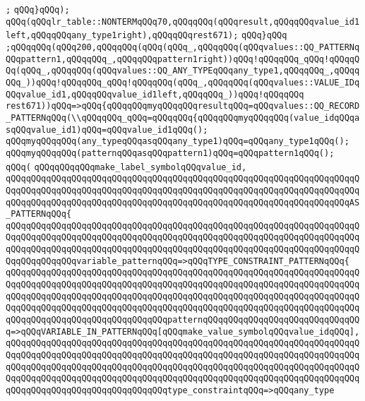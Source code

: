 \verb|;|\newline
\verb|qQQq}qQQq);|\newline
\verb|qQQq(qQQqlr_table::NONTERMqQQq70,qQQqqQQq(qQQqresult,qQQqqQQqvalue_id1left,qQQqqQQqany_type1right),qQQqqQQqrest671);|\newline
\verb|qQQq}qQQq|\newline
\verb|;qQQqqQQq(qQQq200,qQQqqQQq(qQQq(qQQq_,qQQqqQQq(qQQqvalues::QQ_PATTERNqQQqpattern1,qQQqqQQq_,qQQqqQQqpattern1right))qQQq!qQQqqQQq_qQQq!qQQqqQQq(qQQq_,qQQqqQQq(qQQqvalues::QQ_ANY_TYPEqQQqany_type1,qQQqqQQq_,qQQqqQQq_))qQQq!qQQqqQQq_qQQq!qQQqqQQq(qQQq_,qQQqqQQq(qQQqvalues::VALUE_IDqQQqvalue_id1,qQQqqQQqvalue_id1left,qQQqqQQq_))qQQq!qQQqqQQq|\newline
\verb|rest671))qQQq=>qQQq{qQQqqQQqmyqQQqqQQqresultqQQq=qQQqvalues::QQ_RECORD_PATTERNqQQq(\\qQQqqQQq_qQQq=qQQqqQQq{qQQqqQQqmyqQQqqQQq(value_idqQQqasqQQqvalue_id1)qQQq=qQQqvalue_id1qQQq();|\newline
\verb|qQQqmyqQQqqQQq(any_typeqQQqasqQQqany_type1)qQQq=qQQqany_type1qQQq();|\newline
\verb|qQQqmyqQQqqQQq(patternqQQqasqQQqpattern1)qQQq=qQQqpattern1qQQq();|\newline
\newline
\verb|qQQq(|\newline
\verb|qQQqqQQqqQQqmake_label_symbolqQQqvalue_id,|\newline
\verb|qQQqqQQqqQQqqQQqqQQqqQQqqQQqqQQqqQQqqQQqqQQqqQQqqQQqqQQqqQQqqQQqqQQqqQQqqQQqqQQqqQQqqQQqqQQqqQQqqQQqqQQqqQQqqQQqqQQqqQQqqQQqqQQqqQQqqQQqqQQqqQQqqQQqqQQqqQQqqQQqqQQqqQQqqQQqqQQqqQQqqQQqqQQqqQQqqQQqqQQqqQQqqQQqAS_PATTERNqQQq{|\newline
\verb|qQQqqQQqqQQqqQQqqQQqqQQqqQQqqQQqqQQqqQQqqQQqqQQqqQQqqQQqqQQqqQQqqQQqqQQqqQQqqQQqqQQqqQQqqQQqqQQqqQQqqQQqqQQqqQQqqQQqqQQqqQQqqQQqqQQqqQQqqQQqqQQqqQQqqQQqqQQqqQQqqQQqqQQqqQQqqQQqqQQqqQQqqQQqqQQqqQQqqQQqqQQqqQQqqQQqqQQqqQQqqQQqvariable_patternqQQq=>qQQqTYPE_CONSTRAINT_PATTERNqQQq{|\newline
\verb|qQQqqQQqqQQqqQQqqQQqqQQqqQQqqQQqqQQqqQQqqQQqqQQqqQQqqQQqqQQqqQQqqQQqqQQqqQQqqQQqqQQqqQQqqQQqqQQqqQQqqQQqqQQqqQQqqQQqqQQqqQQqqQQqqQQqqQQqqQQqqQQqqQQqqQQqqQQqqQQqqQQqqQQqqQQqqQQqqQQqqQQqqQQqqQQqqQQqqQQqqQQqqQQqqQQqqQQqqQQqqQQqqQQqqQQqqQQqqQQqqQQqqQQqqQQqqQQqqQQqqQQqqQQqqQQqqQQqqQQqqQQqqQQqqQQqqQQqqQQqqQQqqQQqqQQqpatternqQQqqQQqqQQqqQQqqQQqqQQqqQQqqQQq=>qQQqVARIABLE_IN_PATTERNqQQq[qQQqmake_value_symbolqQQqvalue_idqQQq],|\newline
\verb|qQQqqQQqqQQqqQQqqQQqqQQqqQQqqQQqqQQqqQQqqQQqqQQqqQQqqQQqqQQqqQQqqQQqqQQqqQQqqQQqqQQqqQQqqQQqqQQqqQQqqQQqqQQqqQQqqQQqqQQqqQQqqQQqqQQqqQQqqQQqqQQqqQQqqQQqqQQqqQQqqQQqqQQqqQQqqQQqqQQqqQQqqQQqqQQqqQQqqQQqqQQqqQQqqQQqqQQqqQQqqQQqqQQqqQQqqQQqqQQqqQQqqQQqqQQqqQQqqQQqqQQqqQQqqQQqqQQqqQQqqQQqqQQqqQQqqQQqqQQqqQQqqQQqqQQqtype_constraintqQQq=>qQQqany_type|\newline
